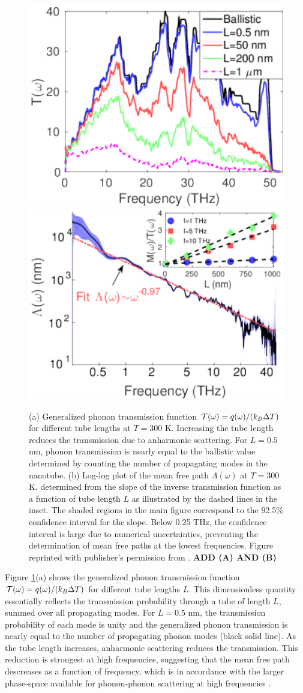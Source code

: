 \begin{figure}[tb]
 \begin{center}
  \includegraphics[width=.49\columnwidth]{pics/cnt_fig2.pdf} 
  \includegraphics[width=.49\columnwidth]{pics/cnt_fig4.pdf} 
  \caption{(a) Generalized phonon transmission function $\mathcal{T}(\omega)=q(\omega)/(k_B\Delta T)$ for different tube lengths at $T=300$ K. Increasing the tube length reduces the transmission due to anharmonic scattering. For $L=0.5$ nm, phonon transmission is nearly equal to the ballistic value determined by counting the number of propagating modes in the nanotube. (b) Log-log plot of the mean free path $\Lambda(\omega)$ at $T=300$ K, determined from the slope of the inverse transmission function as a function of tube length $L$ as illustrated by the dashed lines in the inset. The shaded regions in the main figure correspond to the 92.5\% confidence interval for the slope. Below 0.25 THz, the confidence interval is large due to numerical uncertainties, preventing the determination of mean free paths at the lowest frequencies. Figure reprinted with publisher's permission from . \textbf{ADD (A) AND (B)}}  
\label{fig:cnt_fig2}
 \end{center}
\end{figure}

Figure \ref{fig:cnt_fig2}(a) shows the generalized phonon transmission function $\mathcal{T}(\omega)=q(\omega)/(k_B\Delta T)$ for different tube lengths $L$. This dimensionless quantity essentially reflects the transmission probability through a tube of length $L$, summed over all propagating modes. For $L=0.5$ nm, the transmission probability of each mode is unity and the generalized phonon transmission is nearly equal to the number of propagating phonon modes (black solid line). As the tube length increases, anharmonic scattering reduces the transmission. This reduction is strongest at high frequencies, suggesting that the mean free path descreases as a function of frequency, which is in accordance with the larger phase-space available for phonon-phonon scattering at high frequencies \cite{ziman}.

